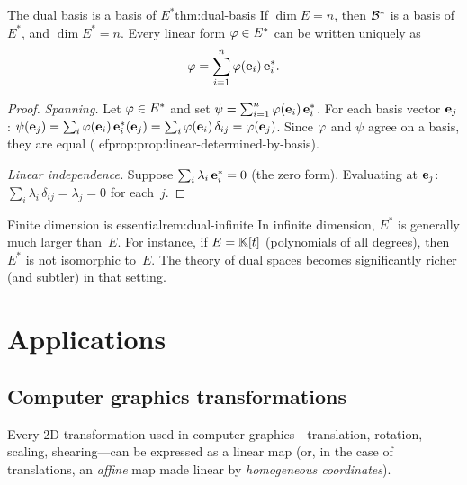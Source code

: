 \begin{theorem}{The dual basis is a basis of $E^*$}{thm:dual-basis}
If $\dim E = n$, then ${\mathcal{B}}^*$ is a basis of $E^*$, and
$\dim E^* = n$. Every linear form $\varphi\in E^*$ can be written
uniquely as
\[
  \varphi = \sum_{i=1}^{n}\varphi(\mathbf{e}_{i})\,\mathbf{e}_{i}^*.
\]
\end{theorem}

\begin{proof}
\textit{Spanning.}\; Let $\varphi\in E^*$ and set
$\psi = \sum_{i=1}^n \varphi(\mathbf{e}_{i})\,\mathbf{e}_{i}^*$. For each basis
vector $\mathbf{e}_{j}$:
$\psi(\mathbf{e}_{j}) = \sum_i \varphi(\mathbf{e}_{i})\,\mathbf{e}_{i}^*(\mathbf{e}_{j})
= \sum_i \varphi(\mathbf{e}_{i})\,\delta_{ij} = \varphi(\mathbf{e}_{j})$.
Since $\varphi$ and $\psi$ agree on a basis, they are equal
(
ef{prop:prop:linear-determined-by-basis}).

\textit{Linear independence.}\; Suppose
$\sum_i \lambda_i\,\mathbf{e}_{i}^* = 0$ (the zero form). Evaluating at
$\mathbf{e}_{j}$: $\sum_i \lambda_i\,\delta_{ij} = \lambda_j = 0$ for
each~$j$.
\end{proof}

\begin{remark}{Finite dimension is essential}{rem:dual-infinite}
In infinite dimension, $E^*$ is generally much larger than~$E$.
For instance, if $E = {\mathbb{K}}[t]$ (polynomials of all degrees), then
$E^*$ is not isomorphic to~$E$. The theory of dual spaces becomes
significantly richer (and subtler) in that setting.
\end{remark}


\section{Applications}\label{sec:applications-ch2}

\subsection{Computer graphics transformations}%
\label{subsec:computer-graphics}

Every 2D transformation used in computer graphics---translation,
rotation, scaling, shearing---can be expressed as a linear map (or, in
the case of translations, an \emph{affine} map made linear by
\emph{homogeneous coordinates}).

